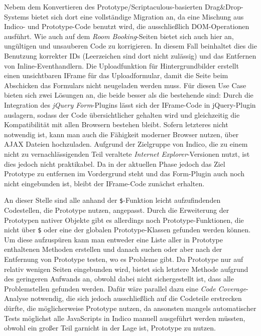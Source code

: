 Nebem dem Konvertieren des Prototype/Scriptaculous-basierten Drag\&Drop-Systems bietet sich dort
eine vollständige Migration an, da eine Mischung aus Indico- und Prototype-Code benutzt wird, die
ausschließlich DOM-Operationen ausführt. Wie auch auf dem \emph{Room Booking}-Seiten bietet sich
auch hier an, ungültigen und unsauberen Code zu korrigieren. In diesem Fall beinhaltet dies die
Benutzung korrekter IDs (Leerzeichen sind dort nicht zulässig) und das Entfernen von
Inline-Eventhandlern. Die Uploadfunktion für Hintergrundbilder erstellt einen unsichtbaren IFrame
für das Uploadformular, damit die Seite beim Abschicken das Formulars nicht neugeladen werden muss.
Für diesen Use Case bieten sich zwei Lösungen an, die beide besser als die bestehende sind: Durch
die Integration des \emph{jQuery Form}-Plugins lässt sich der IFrame-Code in jQuery-Plugin
auslagern, sodass der Code übersichtlicher gehalten wird und gleichzeitig die Kompatibilität mit
allen Browsern bestehen bleibt. Sofern letzteres nicht notwendig ist, kann man auch die Fähigkeit
moderner Browser nutzen, über AJAX Dateien hochzuladen. Aufgrund der Zielgruppe von Indico, die zu
einem nicht zu vernachlässigenden Teil veraltete \emph{Internet Explorer}-Versionen nutzt, ist dies
jedoch nicht praktikabel. Da in der aktuellen Phase jedoch das Ziel Prototype zu entfernen im
Vordergrund steht und das Form-Plugin auch noch nicht eingebunden ist, bleibt der IFrame-Code
zunächst erhalten.

An dieser Stelle sind alle anhand der \lstinline{$}-Funktion leicht aufzufindenden Codestellen, die
Prototype nutzen, angepasst. Durch die Erweiterung der Prototypen nativer Objekte gibt es allerdings
noch Prototype-Funktionen, die nicht über \lstinline{$} oder eine der globalen Prototype-Klassen
gefunden werden können. Um diese aufzuspüren kann man entweder eine Liste aller in Prototype
enthaltenen Methoden erstellen und danach suchen oder aber nach der Entfernung von Prototype testen,
wo es Probleme gibt. Da Prototype nur auf relativ wenigen Seiten eingebunden wird, bietet sich
letztere Methode aufgrund des geringeren Aufwands an, obwohl dabei nicht sichergestellt ist, dass
alle Problemstellen gefunden werden. Dafür wäre parallel dazu eine \emph{Code Coverage}-Analyse
notwendig, die sich jedoch ausschließlich auf die Codeteile erstrecken dürfte, die möglicherweise
Prototype nutzen, da ansonsten mangels automatischer Tests möglichst alle JavaScripts in Indico
manuell ausgeführt werden müssten, obwohl ein großer Teil garnicht in der Lage ist, Prototype zu
nutzen.

